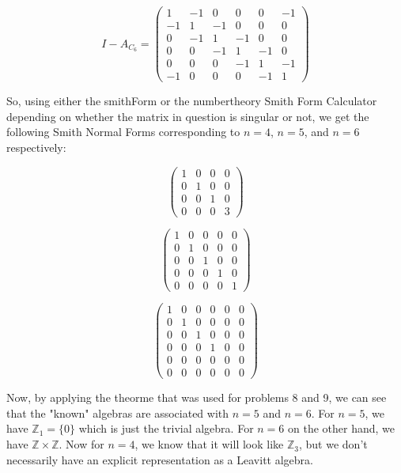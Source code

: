 \begin{solution}
    $$I-A_{C_6}=\left(\begin{array}{cccccc} 1 & -1 & 0 & 0 & 0 & -1 \\ -1 & 1 & -1 & 0 & 0 & 0 \\
                                           0 & -1 & 1 & -1 & 0 & 0 \\ 0 & 0 & -1 & 1 & -1 & 0 \\
                                           0 & 0 & 0 & -1 & 1 & -1 \\ -1 & 0 & 0 & 0 & -1 & 1 
                                        \end{array}\right)$$          

    So, using either the smithForm or the numbertheory Smith Form Calculator depending on whether the
    matrix in question is singular or not, we get the following Smith Normal Forms corresponding to
    $n=4$, $n=5$, and $n=6$ respectively:

    $$\left(\begin{array}{cccc} 1 & 0 & 0 & 0 \\ 0 & 1 & 0 & 0 \\ 
                                0 & 0 & 1 & 0 \\ 0 & 0 & 0 & 3 \end{array}\right)$$

    $$\left(\begin{array}{ccccc} 1 & 0 & 0 & 0 & 0 \\ 0 & 1 & 0 & 0 & 0 \\ 0 & 0 & 1 & 0 & 0 \\ 
                                 0 & 0 & 0 & 1 & 0 \\ 0 & 0 & 0 & 0 & 1 \end{array}\right)$$

    $$\left(\begin{array}{cccccc} 1 & 0 & 0 & 0 & 0 & 0 \\ 0 & 1 & 0 & 0 & 0 & 0 \\
                                  0 & 0 & 1 & 0 & 0 & 0 \\ 0 & 0 & 0 & 1 & 0 & 0 \\
                                  0 & 0 & 0 & 0 & 0 & 0 \\ 0 & 0 & 0 & 0 & 0 & 0 \end{array}\right)$$
\end{solution}

Now, by applying the theorme that was used for problems 8 and 9, we can see that the "known" algebras
are associated with $n=5$ and $n=6$. For $n=5$, we have $\mathbb{Z}_1=\{0\}$ which is just the trivial
algebra. For $n=6$ on the other hand, we have $\mathbb{Z}\times\mathbb{Z}$. Now for $n=4$, we know that
it will look like $\mathbb{Z}_3$, but we don't necessarily have an explicit representation as a Leavitt
algebra.

\newpage

\newpage